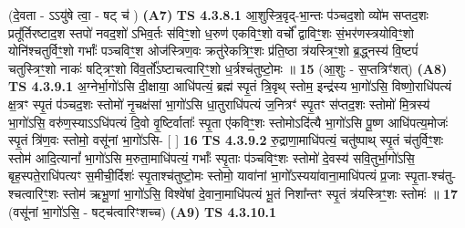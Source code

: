 \documentclass[17pt]{extarticle}
\begin{document}
                  \newline
                      (दे॒वता - ऽऽयु॑षे त्वा॒ - षट् च॑ )  \textbf{(A7)} \newline \newline
                                        \textbf{ TS 4.3.8.1} \newline
                  आ॒शुस्त्रि॒वृद्-भा॒न्तः प॑ञ्चद॒शो व्यो॑म सप्तद॒शः प्रतू᳚र्तिरष्टाद॒श स्तपो॑ नवद॒शो॑ ऽभिव॒र्तः स॑विꣳ॒॒शो ध॒रुण॑ एकविꣳ॒॒शो वर्चो᳚ द्वाविꣳ॒॒शः सं॒भर॑णस्त्रयोविꣳ॒॒शो योनि॑श्चतुर्विꣳ॒॒शो गर्भाः᳚ पञ्चविꣳ॒॒श ओज॑स्त्रिण॒वः क्रतु॑रेकत्रिꣳ॒॒शः प्र॑ति॒ष्ठा त्र॑यस्त्रिꣳ॒॒शो ब्र॒द्ध्नस्य॑ वि॒ष्टपं॑ चतुस्त्रिꣳ॒॒शो नाकः॑ षट्त्रिꣳ॒॒शो वि॑व॒र्तो᳚ऽष्टाचत्वारिꣳ॒॒शो ध॒र्त्रश्च॑तुष्टो॒मः ॥ \textbf{  15} \newline
                  \newline
                      (आ॒शुः - स॒प्तत्रिꣳ॑शत्)  \textbf{(A8)} \newline \newline
                                        \textbf{ TS 4.3.9.1} \newline
                  अ॒ग्नेर्भा॒गो॑ऽसि दी॒क्षाया॒ आधि॑पत्यं॒ ब्रह्म॑ स्पृ॒तं त्रि॒वृथ् स्तोम॒ इन्द्र॑स्य भा॒गो॑ऽसि॒ विष्णो॒राधि॑पत्यं क्ष॒त्रꣳ स्पृ॒तं प॑ञ्चद॒शः स्तोमो॑ नृ॒चक्ष॑सां भा॒गो॑ऽसि धा॒तुराधि॑पत्यं ज॒नित्रꣳ॑ स्पृ॒तꣳ स॑प्तद॒शः स्तोमो॑ मि॒त्रस्य॑ भा॒गो॑ऽसि॒ वरु॑ण॒स्याऽऽधि॑पत्यं दि॒वो वृ॒ष्टिर्वाताः᳚ स्पृ॒ता ए॑कविꣳ॒॒शः स्तोमोऽदि॑त्यै भा॒गो॑ऽसि पू॒ष्ण आधि॑पत्य॒मोजः॑ स्पृ॒तं त्रि॑ण॒वः स्तोमो॒ वसू॑नां भा॒गो॑ऽसि- [  ] \textbf{  16} \newline
                  \newline
                                \textbf{ TS 4.3.9.2} \newline
                  रु॒द्राणा॒माधि॑पत्यं॒ चतु॑ष्पाथ् स्पृ॒तं च॑तुर्विꣳ॒॒शः स्तोम॑ आदि॒त्यानां᳚ भा॒गो॑ऽसि म॒रुता॒माधि॑पत्यं॒ गर्भाः᳚ स्पृ॒ताः प॑ञ्चविꣳ॒॒शः स्तोमो॑ दे॒वस्य॑ सवि॒तुर्भा॒गो॑ऽसि॒ बृह॒स्पते॒राधि॑पत्यꣳ स॒मीची॒र्दिशः॑ स्पृ॒ताश्च॑तुष्टो॒मः स्तोमो॒ यावा॑नां भा॒गो᳚ऽस्यया॑वाना॒माधि॑पत्यं प्र॒जाः स्पृ॒ता-श्च॑तु-श्चत्वारिꣳ॒॒शः स्तोम॑ ऋभू॒णां भा॒गो॑ऽसि॒ विश्वे॑षां दे॒वाना॒माधि॑पत्यं भू॒तं निशा᳚न्तꣳ स्पृ॒तं त्र॑यस्त्रिꣳ॒॒शः स्तोमः॑ ॥ \textbf{  17} \newline
                  \newline
                      (वसू॑नां भा॒गो॑ऽसि॒ - षट्च॑त्वारिꣳशच्च)  \textbf{(A9)} \newline \newline
                                        \textbf{ TS 4.3.10.1} \newline
\end{document}
